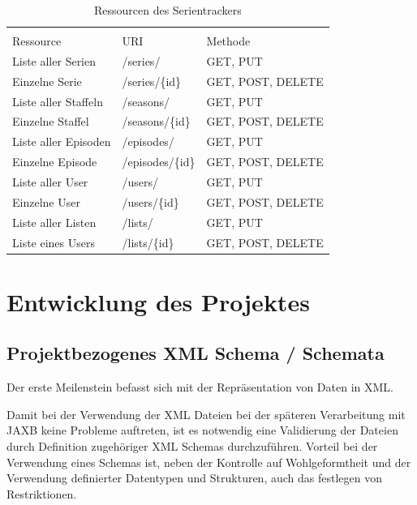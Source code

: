 \documentclass[a4paper]{article}
\begin{document}
\begin{table}[H]
\caption{Ressourcen des Serientrackers}  %

\centering %
\begin{tabular}{l l l} %
\hline\hline %
 \\ [-0.5ex]
 Ressource & URI & Methode
\\ [1ex]
\hline %
Liste aller Serien & /series/ & GET, PUT \\[1ex]
Einzelne Serie & /series/\{id\} & GET, POST, DELETE\\[1ex]
Liste aller Staffeln & /seasons/ & GET, PUT \\[1ex]
Einzelne Staffel & /seasons/\{id\} & GET, POST, DELETE\\[1ex]
Liste aller Episoden & /episodes/ & GET, PUT \\[1ex]
Einzelne Episode & /episodes/\{id\} & GET, POST, DELETE\\[1ex]
Liste aller User & /users/ & GET, PUT \\[1ex]
Einzelne User & /users/\{id\} & GET, POST, DELETE\\[1ex]
Liste aller Listen & /lists/ & GET, PUT\\[1ex]
Liste eines Users & /lists/\{id\} & GET, POST, DELETE\\[1ex]
\hline %
\end{tabular}
\label{tab:PPer}
\end{table}

\newpage

\section{Entwicklung des Projektes}

\subsection{Projektbezogenes XML Schema / Schemata}
Der erste Meilenstein befasst sich mit der Repräsentation von Daten in XML.

Damit bei der Verwendung der XML Dateien bei der späteren Verarbeitung mit JAXB keine Probleme auftreten,
ist es notwendig eine Validierung der Dateien durch Definition zugehöriger XML Schemas durchzuführen.
Vorteil bei der Verwendung eines Schemas ist, neben der Kontrolle auf Wohlgeformtheit und der Verwendung
definierter Datentypen und Strukturen, auch das festlegen von Restriktionen.
\end{document}
